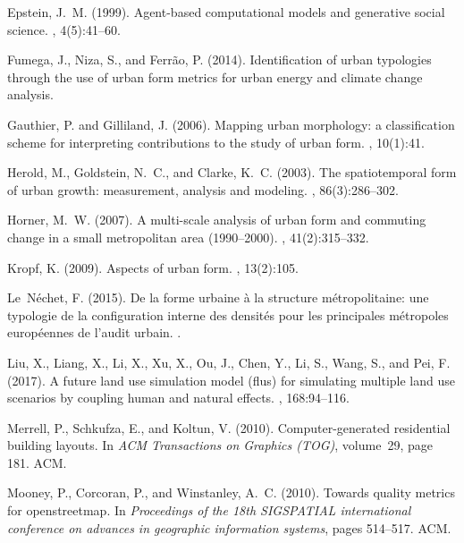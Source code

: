 \documentclass[letterpaper]{article}
\begin{document}
\begin{thebibliography}{}
Epstein, J.~M. (1999).
\newblock Agent-based computational models and generative social science.
, 4(5):41--60.

Fumega, J., Niza, S., and Ferr{\~a}o, P. (2014).
\newblock Identification of urban typologies through the use of urban form
  metrics for urban energy and climate change analysis.

Gauthier, P. and Gilliland, J. (2006).
\newblock Mapping urban morphology: a classification scheme for interpreting
  contributions to the study of urban form.
, 10(1):41.

Herold, M., Goldstein, N.~C., and Clarke, K.~C. (2003).
\newblock The spatiotemporal form of urban growth: measurement, analysis and
  modeling.
, 86(3):286--302.

Horner, M.~W. (2007).
\newblock A multi-scale analysis of urban form and commuting change in a small
  metropolitan area (1990--2000).
, 41(2):315--332.

Kropf, K. (2009).
\newblock Aspects of urban form.
, 13(2):105.

Le~N{\'e}chet, F. (2015).
\newblock De la forme urbaine {\`a} la structure m{\'e}tropolitaine: une
  typologie de la configuration interne des densit{\'e}s pour les principales
  m{\'e}tropoles europ{\'e}ennes de l’audit urbain.
.

Liu, X., Liang, X., Li, X., Xu, X., Ou, J., Chen, Y., Li, S., Wang, S., and
  Pei, F. (2017).
\newblock A future land use simulation model (flus) for simulating multiple
  land use scenarios by coupling human and natural effects.
, 168:94--116.

Merrell, P., Schkufza, E., and Koltun, V. (2010).
\newblock Computer-generated residential building layouts.
\newblock In {\em ACM Transactions on Graphics (TOG)}, volume~29, page 181.
  ACM.

Mooney, P., Corcoran, P., and Winstanley, A.~C. (2010).
\newblock Towards quality metrics for openstreetmap.
\newblock In {\em Proceedings of the 18th SIGSPATIAL international conference
  on advances in geographic information systems}, pages 514--517. ACM.


\end{thebibliography}
\end{document}
